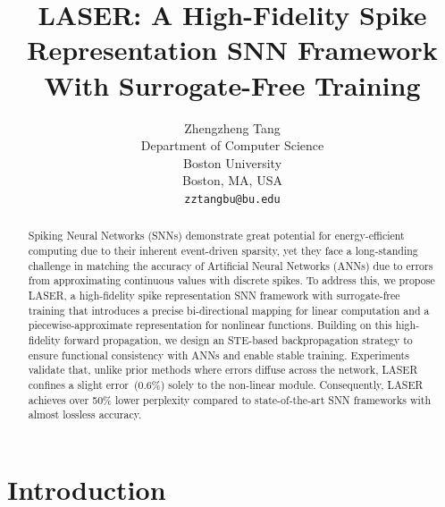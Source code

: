 \documentclass{article}
\title{LASER: A High-Fidelity Spike Representation SNN Framework \\ With Surrogate-Free Training}
\author{%
  Zhengzheng Tang \\
  Department of Computer Science\\
  Boston University\\
  Boston, MA, USA \\
  \texttt{zztangbu@bu.edu} \\
}
\theoremstyle{plain}
\theoremstyle{definition}
\theoremstyle{remark}
\begin{document}
\maketitle

\begin{abstract}
Spiking Neural Networks (SNNs) demonstrate great potential for energy-efficient computing due to their inherent event-driven sparsity, yet they face a long-standing challenge in matching the accuracy of Artificial Neural Networks (ANNs) due to errors from approximating continuous values with discrete spikes. To address this, we propose LASER, a high-fidelity spike representation SNN framework with surrogate-free training that introduces a precise bi-directional mapping for linear computation and a piecewise-approximate representation for nonlinear functions. Building on this high-fidelity forward propagation, we design an STE-based backpropagation strategy to ensure functional consistency with ANNs and enable stable training. Experiments validate that, unlike prior methods where errors diffuse across the network, LASER confines a slight error~(0.6\%) solely to the non-linear module. Consequently, LASER achieves over 50\% lower perplexity compared to state-of-the-art SNN frameworks with almost lossless accuracy.
\end{abstract}
\section{Introduction}
\label{sec:introduction}

\end{document}
